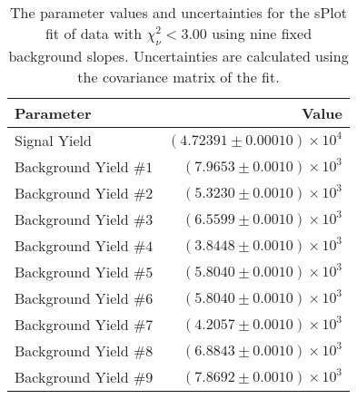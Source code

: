 
\begin{table}[ht]
    \begin{center}
        \begin{tabular}{lr}\toprule
            Parameter & Value \\\midrule
            Signal Yield & $(4.72391 \pm 0.00010) \times 10^{4}$ \\
            Background Yield $\#1$ & $(7.9653 \pm 0.0010) \times 10^{3}$ \\
            Background Yield $\#2$ & $(5.3230 \pm 0.0010) \times 10^{3}$ \\
            Background Yield $\#3$ & $(6.5599 \pm 0.0010) \times 10^{3}$ \\
            Background Yield $\#4$ & $(3.8448 \pm 0.0010) \times 10^{3}$ \\
            Background Yield $\#5$ & $(5.8040 \pm 0.0010) \times 10^{3}$ \\
            Background Yield $\#6$ & $(5.8040 \pm 0.0010) \times 10^{3}$ \\
            Background Yield $\#7$ & $(4.2057 \pm 0.0010) \times 10^{3}$ \\
            Background Yield $\#8$ & $(6.8843 \pm 0.0010) \times 10^{3}$ \\
            Background Yield $\#9$ & $(7.8692 \pm 0.0010) \times 10^{3}$ \\\bottomrule
        \end{tabular}
        \caption{The parameter values and uncertainties for the sPlot fit of data with $\chi^2_\nu < 3.00$ using nine fixed background slopes. Uncertainties are calculated using the covariance matrix of the fit.}\label{tab:splot-fit-results-chisqdof-3.00-fixed-9}
    \end{center}
\end{table}
